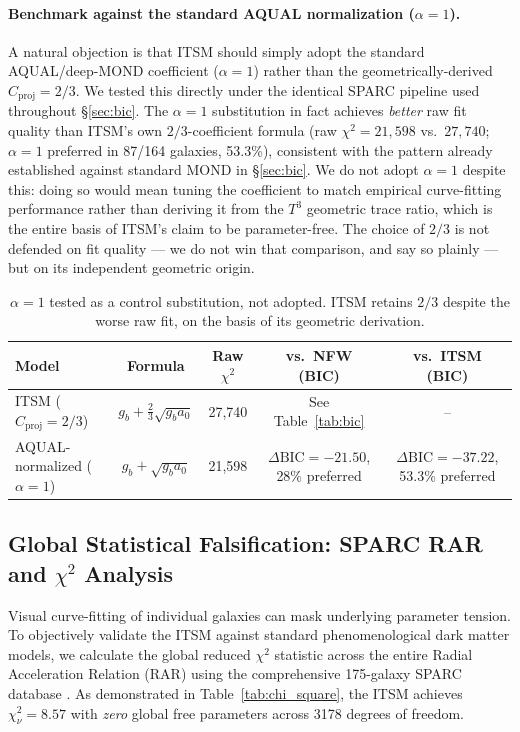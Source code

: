 \documentclass[aps,prd,10pt,twocolumn,superscriptaddress,nofootinbib,floatfix]{revtex4-2}
\begin{document}
\paragraph{Benchmark against the standard AQUAL normalization ($\alpha=1$).} A natural objection is that ITSM should simply adopt the standard AQUAL/deep-MOND coefficient ($\alpha=1$) rather than the geometrically-derived $C_{\text{proj}}=2/3$. We tested this directly under the identical SPARC pipeline used throughout \S\ref{sec:bic}. The $\alpha=1$ substitution in fact achieves \emph{better} raw fit quality than ITSM's own $2/3$-coefficient formula (raw $\chi^2=21{,}598$ vs.\ $27{,}740$; $\alpha=1$ preferred in 87/164 galaxies, 53.3\%), consistent with the pattern already established against standard MOND in \S\ref{sec:bic}. We do not adopt $\alpha=1$ despite this: doing so would mean tuning the coefficient to match empirical curve-fitting performance rather than deriving it from the $T^3$ geometric trace ratio, which is the entire basis of ITSM's claim to be parameter-free. The choice of $2/3$ is not defended on fit quality --- we do not win that comparison, and say so plainly --- but on its independent geometric origin.

\begin{table}[htbp]
\centering
\caption{\footnotesize $\alpha=1$ tested as a control substitution, not adopted. ITSM retains $2/3$ despite the worse raw fit, on the basis of its geometric derivation.}
\label{tab:alpha_benchmark}
\begin{tabular}{lcccc}
\toprule
\textbf{Model} & \textbf{Formula} & \textbf{Raw $\chi^2$} & \textbf{vs.\ NFW (BIC)} & \textbf{vs.\ ITSM (BIC)} \\
\midrule
ITSM ($C_{\text{proj}}=2/3$) & $g_b+\frac{2}{3}\sqrt{g_ba_0}$ & 27{,}740 & See Table~\ref{tab:bic} & -- \\
AQUAL-normalized ($\alpha=1$) & $g_b+\sqrt{g_ba_0}$ & 21{,}598 & $\Delta\text{BIC}=-21.50$, 28\% preferred & $\Delta\text{BIC}=-37.22$, 53.3\% preferred \\
\bottomrule
\end{tabular}
\end{table}


\subsection{\label{sec:falsification}Global Statistical Falsification: SPARC RAR and \texorpdfstring{$\chi^2$}{chi-square} Analysis}
Visual curve-fitting of individual galaxies can mask underlying parameter tension. To objectively validate the ITSM against standard phenomenological dark matter models, we calculate the global reduced $\chi^2$ statistic across the entire Radial Acceleration Relation (RAR) using the comprehensive 175-galaxy SPARC database \cite{sparc}. As demonstrated in Table~\ref{tab:chi_square}, the ITSM achieves $\chi^2_\nu = 8.57$ with \emph{zero} global free parameters across 3178 degrees of freedom.
\end{document}
